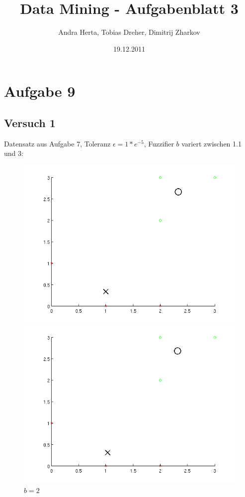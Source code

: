 \title{Data Mining - Aufgabenblatt 3}
\author{Andra Herta, Tobias Dreher, Dimitrij Zharkov}
\date{19.12.2011}

 


\maketitle

\section*{Aufgabe 9}
\subsection*{Versuch 1}
Datensatz aus Aufgabe 7, Toleranz $\epsilon = 1*e^{-5}$, Fuzzifier $b$ variert zwischen 1.1 und 3:
\begin{figure}[h]
  \begin{minipage}[b]{0.5\linewidth}
    \centering
    \includegraphics[width=1\linewidth]{../img/data7b11.png}
    \caption{$b = 1.1$}
  \end{minipage}
  \begin{minipage}[b]{0.5\linewidth}
    \centering
    \includegraphics[width=1\linewidth]{../img/data7b2.png}
    \caption{$b = 2$}	
  \end{minipage}
\end{figure}
